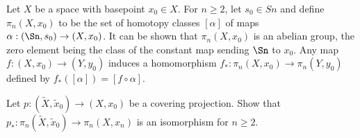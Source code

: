 Let $X$ be a space with basepoint $x_0\in X$. For $n\geq 2$, let
$s_0\in Sn$ and define $\pi_n(X,x_0)$ to be the set of homotopy
classes $[\alpha]$ of maps $\alpha:(\Sn,s_0)\rightarrow (X,x_0)$. It
can be shown that $\pi_n(X,x_0)$ is an abelian group, the zero element
being the class of the constant map sending $\Sn$ to $x_0$. Any map
$f:(X,x_0)\rightarrow (Y,y_0)$ induces a homomorphism
$f_*:\pi_n(X,x_0)\rightarrow \pi_n(Y,y_0)$ defined by
$f_*([\alpha])=[f\circ \alpha]$.

Let $p:(\tilde{X},\tilde{x}_0)\rightarrow (X,x_0)$ be a covering
projection. Show that $p_*:\pi_n(\tilde{X},\tilde{x}_0)\rightarrow
\pi_n(X,x_n)$ is an isomorphism for $n\geq 2$.
